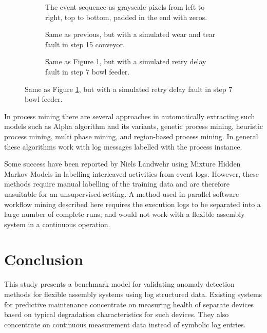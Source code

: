\documentclass[procedia]{easychair}
\begin{document}
\begin{figure}[tb]
\begin{subfigure}[h]{0.4\linewidth}
 \resizebox{0.95\linewidth}{!}{}
 \caption{The event sequence as grayscale pixels from left to right, top to bottom, padded in the end with zeros.}
 \label{figure:output_easy}
\end{subfigure}
\begin{subfigure}[h]{0.4\linewidth}
 \resizebox{0.95\linewidth}{!}{}
 \caption{Same as previous, but with a simulated wear and tear fault in step 15 conveyor.}
 \label{figure:output_easy_wear_and_tear}
\end{subfigure}
\begin{subfigure}[h]{0.4\linewidth}
 \resizebox{0.95\linewidth}{!}{}
 \caption{Same as Figure \ref{figure:output_easy}, but with a simulated retry delay fault in step 7 bowl feeder.}
 \label{figure:output_easy_retry_delay}
\end{subfigure}
\end{figure}

In process mining there are several approaches in automatically extracting such models such as Alpha algorithm and its 
variants, genetic process mining, heuristic process mining, multi phase mining, and region-based process mining. In general these algorithms work with log messages labelled with the process instance.

Some success have been reported by Niels Landwehr using Mixture Hidden Markov Models \cite{landwehr2008modeling} in labelling interleaved activities from event logs.
However, these methods require manual labelling of the training data and are therefore unsuitable for an unsupervised setting.
A method used in parallel software workflow mining described here \cite{mining-program-workflow-from-interleaved-traces} requires the execution logs to be separated into
a large number of complete runs, and would not work with a flexible assembly system in a continuous operation.

\section{Conclusion}

This study presents a benchmark model for validating anomaly detection methods for flexible assembly systems using log structured data.
Existing systems for predictive maintenance concentrate on measuring health of separate devices based on typical degradation characteristics
for such devices. They also concentrate on continuous measurement data instead of symbolic log entries.
\end{document}
